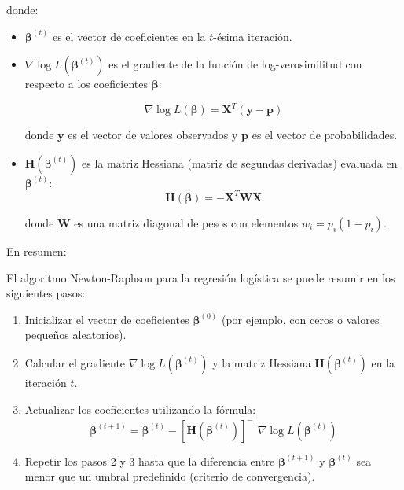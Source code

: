 donde:
\begin{itemize}
    \item $\boldsymbol{\beta}^{(t)}$ es el vector de coeficientes en la $t$-ésima iteración.
    \item $\nabla \log L(\boldsymbol{\beta}^{(t)})$ es el gradiente de la función de log-verosimilitud con respecto a los coeficientes $\boldsymbol{\beta}$:

\begin{equation}\label{Eq.Gradiente1}
\nabla \log L(\boldsymbol{\beta}) = \mathbf{X}^T (\mathbf{y} - \mathbf{p})
\end{equation}

donde $\mathbf{y}$ es el vector de valores observados y $\mathbf{p}$ es el vector de probabilidades.
    \item $\mathbf{H}(\boldsymbol{\beta}^{(t)})$ es la matriz Hessiana (matriz de segundas derivadas) evaluada en $\boldsymbol{\beta}^{(t)}$:
\begin{equation}\label{Eq.Hessiana1}
\mathbf{H}(\boldsymbol{\beta}) = -\mathbf{X}^T \mathbf{W} \mathbf{X}
\end{equation}

donde $\mathbf{W}$ es una matriz diagonal de pesos con elementos $w_i = p_i (1 - p_i)$.

\end{itemize}

En resumen:

\begin{Algthm}\label{Algoritmo1}
El algoritmo Newton-Raphson para la regresión logística se puede resumir en los siguientes pasos:
\begin{enumerate}
    \item Inicializar el vector de coeficientes $\boldsymbol{\beta}^{(0)}$ (por ejemplo, con ceros o valores pequeños aleatorios).
    \item Calcular el gradiente $\nabla \log L(\boldsymbol{\beta}^{(t)})$ y la matriz Hessiana $\mathbf{H}(\boldsymbol{\beta}^{(t)})$ en la iteración $t$.
    \item Actualizar los coeficientes utilizando la fórmula:
    \begin{equation}\label{Eq.Criterio1}
    \boldsymbol{\beta}^{(t+1)} = \boldsymbol{\beta}^{(t)} - \left[ \mathbf{H}(\boldsymbol{\beta}^{(t)}) \right]^{-1} \nabla \log L(\boldsymbol{\beta}^{(t)})
    \end{equation}
    \item Repetir los pasos 2 y 3 hasta que la diferencia entre $\boldsymbol{\beta}^{(t+1)}$ y $\boldsymbol{\beta}^{(t)}$ sea menor que un umbral predefinido (criterio de convergencia).
\end{enumerate}
\end{Algthm}


